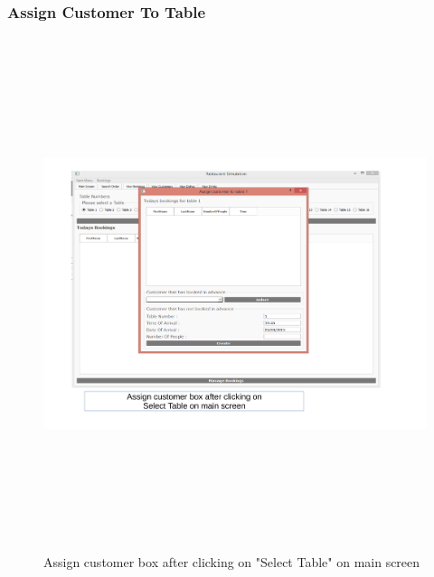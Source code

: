 \begin{landscape}
\subsubsection{Assign Customer To Table}
\begin{figure}[H]
    \includegraphics[height = 15cm]{./Maintenance/images/screen9}
    \caption{Assign customer box after clicking on "Select Table" on main screen} \label{fig:screen9}
\end{figure}


\end{landscape}
